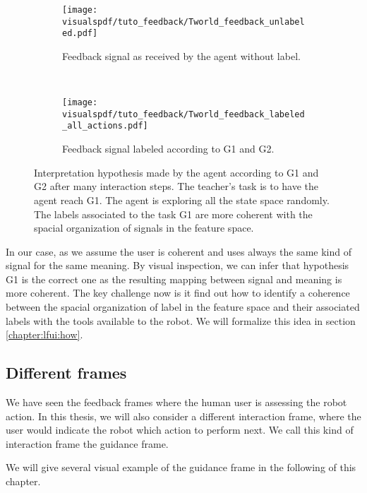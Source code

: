 \begin{figure}[!ht]
    \centering
    \begin{subfigure}[t]{\tworldsize\columnwidth}
        \centering
        \texttt{[image: \\visualspdf/tuto\_feedback/Tworld\_feedback\_unlabeled.pdf]}
        \caption{Feedback signal as received by the agent without label.}
    \end{subfigure}\\
    \begin{subfigure}[b]{\columnwidth}
        \centering
        \texttt{[image: \\visualspdf/tuto\_feedback/Tworld\_feedback\_labeled\_all\_actions.pdf]}
        \caption{Feedback signal labeled according to G1 and G2.}
        \label{fig:TworldLabelinterpretation}
    \end{subfigure}
    \caption{Interpretation hypothesis made by the agent according to G1 and G2 after many interaction steps. The teacher's task is to have the agent reach G1. The agent is exploring all the state space randomly. The labels associated to the task G1 are more coherent with the spacial organization of signals in the feature space.}
    \label{fig:TworldLabel}
\end{figure}

In our case, as we assume the user is coherent and uses always the same kind of signal for the same meaning. By visual inspection, we can infer that hypothesis G1 is the correct one as the resulting mapping between signal and meaning is more coherent. The key challenge now is it find out how to identify a coherence between the spacial organization of label in the feature space and their associated labels with the tools available to the robot. We will formalize this idea in section \ref{chapter:lfui:how}. 

\subsection{Different frames}

We have seen the feedback frames where the human user is assessing the robot action. In this thesis, we will also consider a different interaction frame, where the user would indicate the robot which action to perform next. We call this kind of interaction frame the guidance frame.

We will give several visual example of the guidance frame in the following of this chapter.



